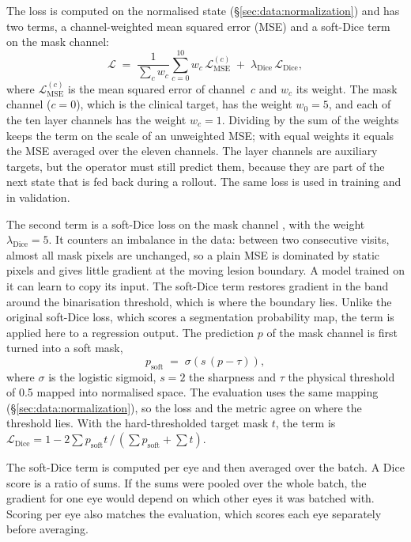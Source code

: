 The loss is computed on the normalised state (\S\ref{sec:data:normalization})
and has two terms, a channel-weighted mean squared error (MSE) and a
soft-Dice term on the mask channel:
\begin{equation}
  \mathcal{L} \;=\; \frac{1}{\sum_{c} w_c} \sum_{c=0}^{10} w_c\,
  \mathcal{L}_{\text{MSE}}^{(c)} \;+\; \lambda_{\text{Dice}}\,
  \mathcal{L}_{\text{Dice}},
  \label{eq:method:loss}
\end{equation}
where $\mathcal{L}_{\text{MSE}}^{(c)}$ is the mean squared error of
channel~$c$ and $w_c$ its weight.
The mask channel ($c = 0$), which is the clinical target, has the weight
$w_0 = 5$, and each of the ten layer channels has the weight $w_c = 1$.
Dividing by the sum of the weights keeps the term on the scale of an
unweighted MSE; with equal weights it equals the MSE averaged over the
eleven channels. The layer channels are auxiliary targets, but the operator
must still predict them, because they are part of the next state that is
fed back during a rollout. The same loss is used in training and in
validation.

The second term is a soft-Dice loss on the mask channel
\citep{Milletari2016}, with the weight $\lambda_{\text{Dice}} = 5$. It
counters an imbalance in the data: between two consecutive visits, almost
all mask pixels are unchanged, so a plain MSE is dominated by static pixels
and gives little gradient at the moving lesion boundary. A model trained
on it can learn to copy its input. The soft-Dice term restores gradient in
the band around the binarisation threshold, which is where the boundary
lies. Unlike the original soft-Dice loss, which scores a segmentation
probability map, the term is applied here to a regression output. The prediction $p$ of the mask channel is first
turned into a soft mask,
\begin{equation}
  p_{\text{soft}} \;=\; \sigma\!\left(s\,(p - \tau)\right),
  \label{eq:method:soft-mask}
\end{equation}
where $\sigma$ is the logistic sigmoid, $s = 2$ the sharpness and $\tau$
the physical threshold of 0.5 mapped into normalised space. The evaluation
uses the same mapping (\S\ref{sec:data:normalization}), so the loss and the
metric agree on where the threshold lies. With the hard-thresholded target
mask $t$, the term is
$\mathcal{L}_{\text{Dice}} = 1 - 2 \sum p_{\text{soft}} t \,/\,
(\sum p_{\text{soft}} + \sum t)$.

The soft-Dice term is computed per eye and then averaged over the batch.
A Dice score is a ratio of sums. If the sums were pooled over the whole
batch, the gradient for one eye would depend on which other eyes it was
batched with. Scoring per eye also matches the evaluation, which scores
each eye separately before averaging.

